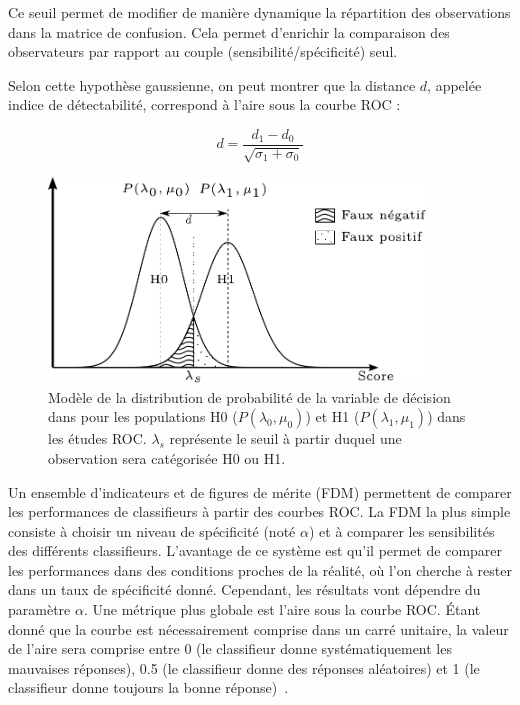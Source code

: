 Ce seuil permet de modifier de manière dynamique la répartition des observations dans la matrice de confusion.  Cela permet d'enrichir la comparaison des observateurs par rapport au couple (sensibilité/spécificité) seul.

Selon cette hypothèse gaussienne, on peut montrer que la distance $d$, appelée indice de détectabilité, correspond à l'aire sous la courbe ROC :


\begin{equation}
 d= \frac{d_1 - d_0}{\sqrt{\sigma_1 + \sigma_0}}
\end{equation}

\begin{figure}[h]
	\begin{center}
	\includegraphics[width=10cm]{images/loiROC}
	\vspace{-0.5cm} %
	\end{center}
	\caption[Modèle de la distribution de probabilité de la variable de décision]{Modèle de la distribution de probabilité de la variable de décision dans pour les populations H0 ($P(\lambda_0, \mu_0)$) et H1 ($P(\lambda_1, \mu_1)$) dans les études ROC. $\lambda_s$ représente le seuil à partir duquel une observation sera catégorisée H0 ou H1.}
	\label{fig:loiROC}
\end{figure}




Un ensemble d'indicateurs et de figures de mérite (FDM) permettent de comparer les performances de classifieurs à partir des courbes ROC. La FDM la plus simple consiste à choisir un niveau de spécificité (noté $\alpha$) et à comparer les sensibilités des différents classifieurs. L'avantage de ce système est qu'il permet de comparer les performances dans des conditions proches de la réalité, où l'on cherche à rester dans un taux de spécificité donné. Cependant, les résultats vont dépendre du paramètre $\alpha$. Une métrique plus globale est l'aire sous la courbe ROC. \'Etant donné que la courbe est nécessairement comprise dans un carré unitaire, la valeur de l'aire sera comprise entre 0 (le classifieur donne systématiquement les mauvaises réponses), 0.5 (le classifieur donne des réponses aléatoires) et 1 (le classifieur donne toujours la bonne réponse)~\cite{nie2006integrating}.


